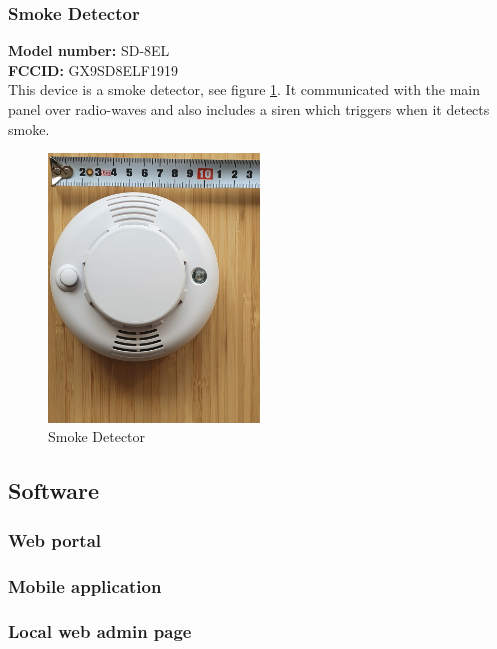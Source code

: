 \subsubsection{Smoke Detector}
\textbf{Model number:} SD-8EL \\
\textbf{FCCID:} GX9SD8ELF1919 \\
This device is a smoke detector, see figure \ref{fig:smoke-detector}. It communicated with the main panel over radio-waves and also includes a siren which triggers when it detects smoke.
\begin{figure}[!ht]
  \begin{center}
    \includegraphics[width=0.5\textwidth]{images/smoke-detector.png}
  \end{center}
  \caption{Smoke Detector}
  \label{fig:smoke-detector}
\end{figure}

\subsection{Software} \label{ch:system:software}
\subsubsection{Web portal}

\subsubsection{Mobile application}

\subsubsection{Local web admin page}